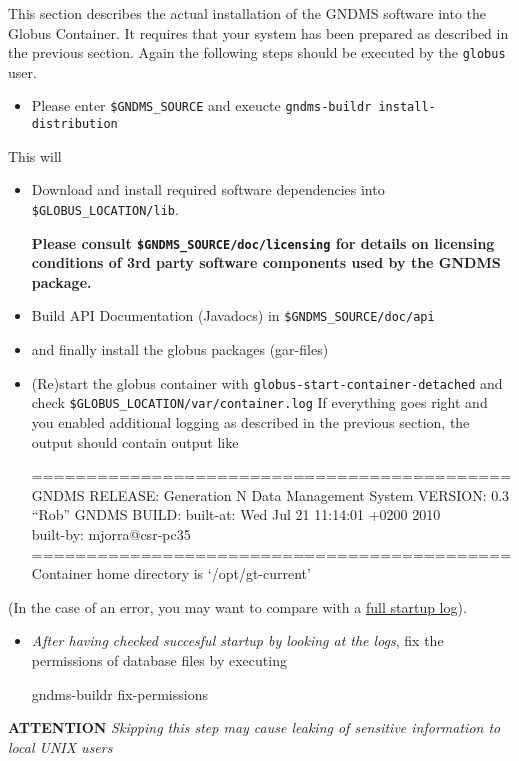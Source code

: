 \documentclass{article}
\begin{document}
This section describes the actual installation of the GNDMS
software into the Globus Container. It requires that your system
has been prepared as described in the previous section. Again the
following steps should be executed by the \verb!globus! user.

\begin{itemize}
\item
  Please enter \verb!$GNDMS_SOURCE! and exeucte
  \verb!gndms-buildr install-distribution!
\end{itemize}
This will

\begin{itemize}
\item
  Download and install required software dependencies into
  \verb!$GLOBUS_LOCATION/lib!.

  \textbf{Please consult \texttt{\$GNDMS\_SOURCE/doc/licensing} for details on licensing conditions of 3rd party software components used by the GNDMS package.}

\item
  Build API Documentation (Javadocs) in \verb!$GNDMS_SOURCE/doc/api!
\item
  and finally install the globus packages (gar-files)

\item
  (Re)start the globus container with
  \verb!globus-start-container-detached! and check
  \verb!$GLOBUS_LOCATION/var/container.log! If everything goes right
  and you enabled additional logging as described in the previous
  section, the output should contain output like

  {\small ============================================\\
  GNDMS RELEASE: Generation N Data Management System VERSION: 0.3\\
  ``Rob'' GNDMS BUILD: built-at: Wed Jul 21 11:14:01 +0200 2010\\
  built-by: mjorra@csr-pc35\\
  ============================================\\
  Container home directory is `/opt/gt-current'}

\end{itemize}
(In the case of an error, you may want to compare with a
\href{startup-log.txt}{full startup log}).

\begin{itemize}
\item
  \emph{After having checked succesful startup by looking at the logs},
  fix the permissions of database files by executing

  gndms-buildr fix-permissions

\end{itemize}
\textbf{ATTENTION}
\emph{Skipping this step may cause leaking of sensitive information to local UNIX users}
\end{document}
